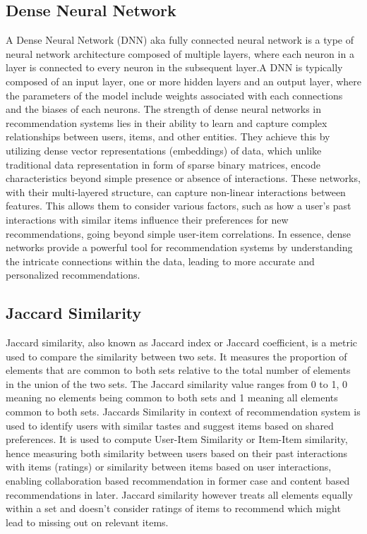 \subsection{Dense Neural Network}
A Dense Neural Network (DNN) aka fully connected neural network is a type of neural network architecture composed of multiple layers, where each neuron in a layer is connected to every neuron in the subsequent layer.A DNN is typically composed of an input layer, one or more hidden layers and an output layer, where the parameters of the model include weights associated with each connections and the biases of each neurons.
The strength of dense neural networks in recommendation systems lies in their ability to learn and capture complex relationships between users, items, and other entities. They achieve this by utilizing dense vector representations (embeddings) of data, which unlike traditional data representation in form of sparse binary matrices, encode characteristics beyond simple presence or absence of interactions. These networks, with their multi-layered structure, can capture non-linear interactions between features. This allows them to consider various factors, such as how a user's past interactions with similar items influence their preferences for new recommendations, going beyond simple user-item correlations.
In essence, dense networks provide a powerful tool for recommendation systems by understanding the intricate connections within the data, leading to more accurate and personalized recommendations.


\subsection{Jaccard Similarity}

Jaccard similarity, also known as Jaccard index or Jaccard coefficient, is a metric used to compare the similarity between two sets. It measures the proportion of elements that are common to both sets relative to the total number of elements in the union of the two sets. The Jaccard similarity value ranges from 0 to 1, 0 meaning no elements being common to both sets and 1 meaning all elements common to both sets. Jaccards Similarity in context of recommendation system is used to identify users with similar tastes and suggest items based on shared preferences. It is used to compute User-Item Similarity or Item-Item similarity, hence measuring both similarity between users based on their past interactions with items (ratings) or similarity between items based on user interactions, enabling collaboration based recommendation in former case and content based recommendations in later. Jaccard similarity however treats all elements equally within a set and doesn't consider ratings of items to recommend which might lead to missing out on relevant items.


